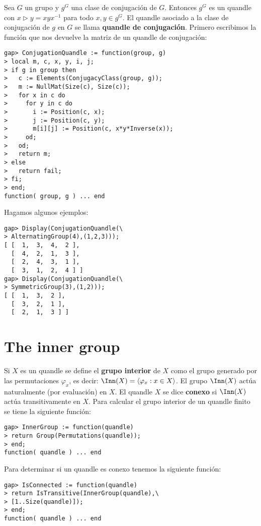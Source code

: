\begin{block}
Sea $G$ un grupo y $g^G$ una clase de conjugación de $G$. Entonces $g^G$ es un
quandle con $x\triangleright y=xyx^{-1}$ para todo $x,y\in g^G$.  El quandle
asociado a la clase de conjugación de $g$ en $G$ se llama \textbf{quandle de
conjugación}. Primero escribimos la función que nos devuelve la matriz de un
quandle de conjugación:
\begin{lstlisting}
gap> ConjugationQuandle := function(group, g)
> local m, c, x, y, i, j;
> if g in group then
>   c := Elements(ConjugacyClass(group, g));
>   m := NullMat(Size(c), Size(c));
>   for x in c do
>     for y in c do
>       i := Position(c, x);
>       j := Position(c, y);
>       m[i][j] := Position(c, x*y*Inverse(x));
>     od;
>   od;
>   return m;
> else
>   return fail;
> fi;
> end;
function( group, g ) ... end
\end{lstlisting}
Hagamos algunos ejemplos:
\begin{lstlisting}
gap> Display(ConjugationQuandle(\ 
> AlternatingGroup(4),(1,2,3)));
[ [  1,  3,  4,  2 ],
  [  4,  2,  1,  3 ],
  [  2,  4,  3,  1 ],
  [  3,  1,  2,  4 ] ]
gap> Display(ConjugationQuandle(\
> SymmetricGroup(3),(1,2)));
[ [  1,  3,  2 ],
  [  3,  2,  1 ],
  [  2,  1,  3 ] ]
\end{lstlisting}
\end{block}



\section{The inner group}

\begin{block} 
\label{block:InnerGroup}
Si $X$ es un quandle se define el \textbf{grupo interior} de $X$ como el grupo
generado por las permutaciones $\varphi_x$, es decir: $\Inn(X)=\langle
\varphi_x:x\in X\rangle$. El grupo $\Inn(X)$ actúa naturalmente (por
evaluación) en $X$. El quandle $X$ se dice \textbf{conexo} si $\Inn(X)$ actúa
transitivamente en $X$. Para calcular el grupo interior de un quandle finito se
tiene la siguiente función:
\begin{lstlisting}
gap> InnerGroup := function(quandle)
> return Group(Permutations(quandle));
> end;
function( quandle ) ... end
\end{lstlisting}
Para determinar si un quandle es conexo tenemos la siguiente función:
\begin{lstlisting}
gap> IsConnected := function(quandle)
> return IsTransitive(InnerGroup(quandle),\
> [1..Size(quandle)]);
> end;
function( quandle ) ... end
\end{lstlisting}
\end{block}

